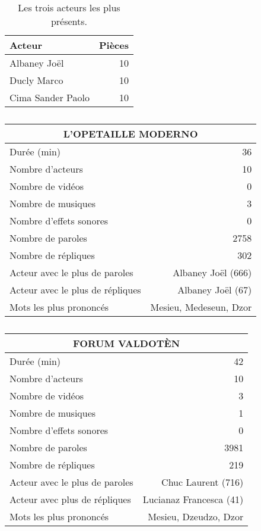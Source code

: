 \begin{table}[]
\centering
\caption{Les trois acteurs les plus présents.}
\begin{tabular}{lr}
    \toprule
\multicolumn{1}{l}{\textbf{Acteur}} & \textbf{Pièces} \\
    \midrule
\multicolumn{1}{l}{Albaney Joël} &10\\
\multicolumn{1}{l}{Ducly Marco} &10\\
\multicolumn{1}{l}{Cima Sander Paolo} &10\\
\bottomrule
\end{tabular}%
\end{table}
\newpage
    \begin{table}[]
    \centering
    \caption{}
    \begin{tabular}{lr}\toprule\multicolumn{2}{c}{L’OPETAILLE MODERNO} \\\midrule
\multicolumn{1}{l}{Durée (min)}&36\\
\multicolumn{1}{l}{Nombre d'acteurs}&10\\
\multicolumn{1}{l}{Nombre de vidéos}&0\\
\multicolumn{1}{l}{Nombre de musiques}&3\\
\multicolumn{1}{l}{Nombre d'effets sonores}&0\\
\multicolumn{1}{l}{Nombre de paroles}&2758\\
\multicolumn{1}{l}{Nombre de répliques}&302\\
\multicolumn{1}{l}{Acteur avec le plus de paroles}&Albaney Joël (666)\\
\multicolumn{1}{l}{Acteur avec le plus de répliques}&Albaney Joël (67)\\
\multicolumn{1}{l}{Mots les plus prononcés}&Mesieu, Medeseun, Dzor\\
    \bottomrule
    \end{tabular}%
    \end{table}
    \begin{table}[]
    \centering
    \caption{}
    \begin{tabular}{lr}\toprule\multicolumn{2}{c}{FORUM VALDOTÈN} \\\midrule
\multicolumn{1}{l}{Durée (min)}&42\\
\multicolumn{1}{l}{Nombre d'acteurs}&10\\
\multicolumn{1}{l}{Nombre de vidéos}&3\\
\multicolumn{1}{l}{Nombre de musiques}&1\\
\multicolumn{1}{l}{Nombre d'effets sonores}&0\\
\multicolumn{1}{l}{Nombre de paroles}&3981\\
\multicolumn{1}{l}{Nombre de répliques}&219\\
\multicolumn{1}{l}{Acteur avec le plus de paroles}&Chuc Laurent (716)\\
\multicolumn{1}{l}{Acteur avec plus de répliques}&Lucianaz Francesca (41)\\
\multicolumn{1}{l}{Mots les plus prononcés}&Mesieu, Dzeudzo, Dzor\\
    \bottomrule
    \end{tabular}%
    \end{table}
